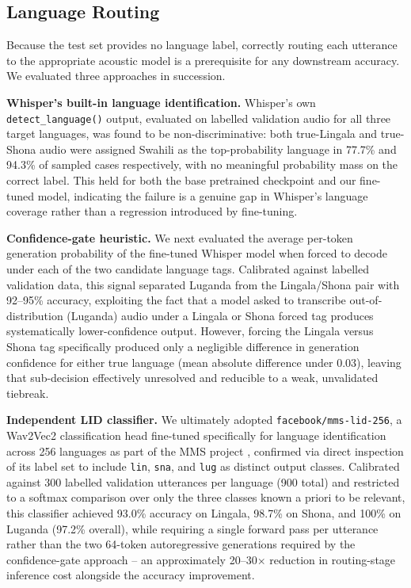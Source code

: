 \documentclass[11pt]{article}
\begin{document}
\subsection{Language Routing}
\label{sec:routing}

Because the test set provides no language label, correctly routing each utterance to the appropriate acoustic model is a prerequisite for any downstream accuracy. We evaluated three approaches in succession.

\textbf{Whisper's built-in language identification.} Whisper's own \texttt{detect\_language()} output, evaluated on labelled validation audio for all three target languages, was found to be non-discriminative: both true-Lingala and true-Shona audio were assigned Swahili as the top-probability language in 77.7\% and 94.3\% of sampled cases respectively, with no meaningful probability mass on the correct label. This held for both the base pretrained checkpoint and our fine-tuned model, indicating the failure is a genuine gap in Whisper's language coverage rather than a regression introduced by fine-tuning.

\textbf{Confidence-gate heuristic.} We next evaluated the average per-token generation probability of the fine-tuned Whisper model when forced to decode under each of the two candidate language tags. Calibrated against labelled validation data, this signal separated Luganda from the Lingala/Shona pair with 92--95\% accuracy, exploiting the fact that a model asked to transcribe out-of-distribution (Luganda) audio under a Lingala or Shona forced tag produces systematically lower-confidence output. However, forcing the Lingala versus Shona tag specifically produced only a negligible difference in generation confidence for either true language (mean absolute difference under 0.03), leaving that sub-decision effectively unresolved and reducible to a weak, unvalidated tiebreak.

\textbf{Independent LID classifier.} We ultimately adopted \texttt{facebook/mms-lid-256}, a Wav2Vec2 classification head fine-tuned specifically for language identification across 256 languages as part of the MMS project \cite{pratap2024mms}, confirmed via direct inspection of its label set to include \texttt{lin}, \texttt{sna}, and \texttt{lug} as distinct output classes. Calibrated against 300 labelled validation utterances per language (900 total) and restricted to a softmax comparison over only the three classes known a priori to be relevant, this classifier achieved 93.0\% accuracy on Lingala, 98.7\% on Shona, and 100\% on Luganda (97.2\% overall), while requiring a single forward pass per utterance rather than the two 64-token autoregressive generations required by the confidence-gate approach -- an approximately 20--30$\times$ reduction in routing-stage inference cost alongside the accuracy improvement.
\end{document}
